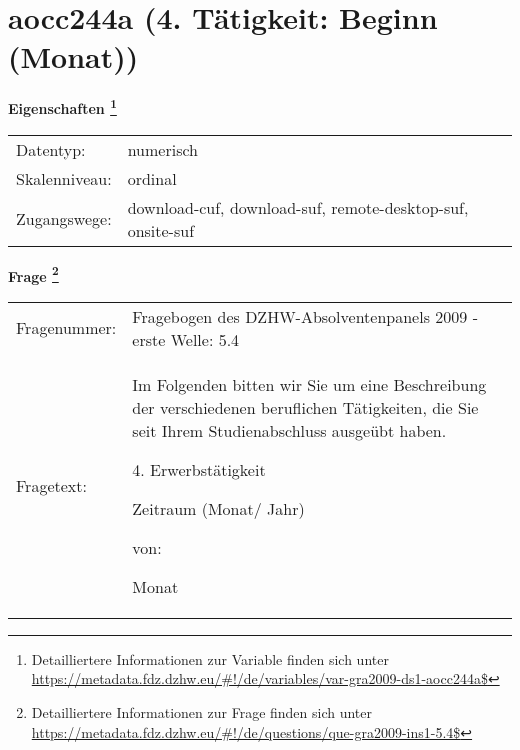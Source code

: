 
    \setcounter{footnote}{0}

    \vspace*{-1.8cm}
	\section{aocc244a (4. Tätigkeit: Beginn (Monat))}
	\label{section:aocc244a}



    \vspace*{0.5cm}
    \noindent\textbf{Eigenschaften
	\footnote{Detailliertere Informationen zur Variable finden sich unter
		\url{https://metadata.fdz.dzhw.eu/\#!/de/variables/var-gra2009-ds1-aocc244a$}}}\\
	\begin{tabularx}{\hsize}{@{}lX}
	Datentyp: & numerisch \\
	Skalenniveau: & ordinal \\
	Zugangswege: &
	  download-cuf, 
	  download-suf, 
	  remote-desktop-suf, 
	  onsite-suf
 \\
    \end{tabularx}



				\vspace*{0.5cm}
                \noindent\textbf{Frage
	                \footnote{Detailliertere Informationen zur Frage finden sich unter
		              \url{https://metadata.fdz.dzhw.eu/\#!/de/questions/que-gra2009-ins1-5.4$}}}\\
				\begin{tabularx}{\hsize}{@{}lX}
					Fragenummer: &
					  Fragebogen des DZHW-Absolventenpanels 2009 - erste Welle:
					  5.4
 \\
					Fragetext: & Im Folgenden bitten wir Sie um eine Beschreibung der verschiedenen beruflichen Tätigkeiten, die Sie seit Ihrem Studienabschluss ausgeübt haben.\par  4. Erwerbstätigkeit\par  Zeitraum (Monat/ Jahr)\par  von:\par  Monat \\
				\end{tabularx}





